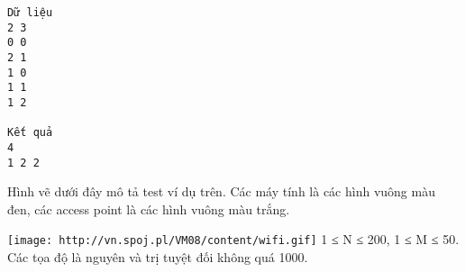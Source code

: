 \begin{verbatim}
Dữ liệu
2 3
0 0
2 1
1 0
1 1
1 2

Kết quả
4
1 2 2
\end{verbatim}

Hình vẽ dưới đây mô tả test ví dụ trên. Các máy tính là các hình vuông màu đen, các access point là các hình vuông màu trắng.


\texttt{[image: http://vn.spoj.pl/VM08/content/wifi.gif]}
1 ≤ N ≤ 200, 1 ≤ M ≤ 50. Các tọa độ là nguyên và trị tuyệt đối không quá 1000.